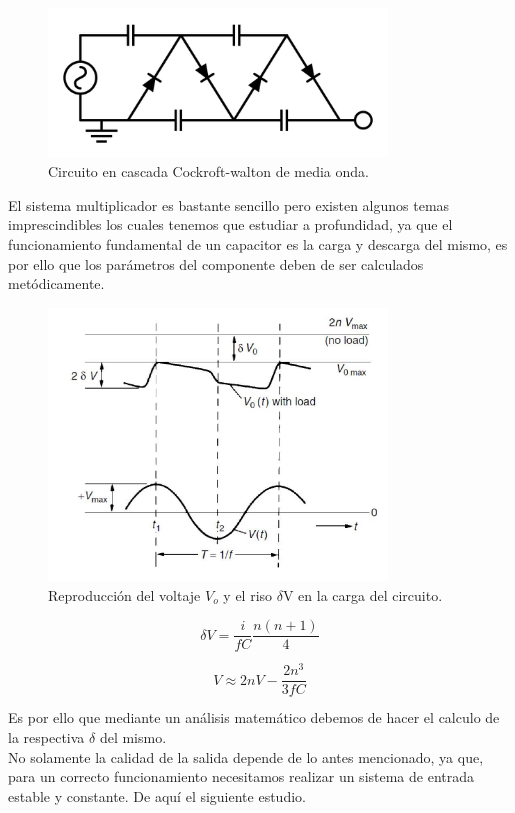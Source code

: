 \begin{figure}[H]
\centering
\includegraphics[width=9cm]{capitulo2/figs/circ.png}
\caption{ Circuito en cascada Cockroft-walton de media onda.}
\end{figure}
El sistema multiplicador es bastante sencillo pero existen algunos temas imprescindibles los cuales tenemos que estudiar a profundidad, ya que el funcionamiento fundamental de un capacitor es la carga y descarga del mismo, es por ello que los parámetros del componente deben de ser calculados metódicamente.

\begin{figure}[H]
\centering
\includegraphics[width=9cm]{capitulo2/figs/riso.png}
\caption{ Reproducción del voltaje $V_{o}$ y el riso $\delta$V en la carga del circuito.}
\end{figure}

\begin{equation}
\delta V=\frac{i}{fC}\frac{n(n+1)}{4}
\end{equation}

\begin{equation}
V\approx 2nV-\frac{2n^{3}}{3fC}
\end{equation}

Es por ello que mediante un análisis matemático debemos de hacer el calculo de la respectiva $\delta$ del mismo.\\
No solamente la calidad de la salida depende de lo antes mencionado, ya que, para un correcto funcionamiento necesitamos realizar un sistema de entrada estable y constante. De aquí el siguiente estudio.